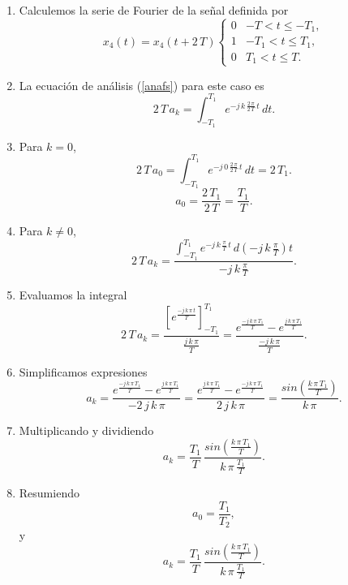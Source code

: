 \begin{enumerate}
\item  Calculemos la serie de Fourier de la se\~{n}al definida por
\begin{equation}
x_{4}\left( t\right) = x_{4}(t+2 \, T)\left\{ 
\begin{array}{cc}
0   & -T < t \leq -T_{1}, \\
1  & -T_{1} < t \leq T_{1}, \\ 
0  & T_{1} < t \leq T.
\end{array}
\right. \label{squarewaveone.1}
\end{equation}
\item La ecuación de análisis (\ref{anafs}) para este caso es
\begin{equation}
2 \, T \, a_{k} = 
\int_{-T_{1}}^{T_{1}} e^{-j \, k \,\frac{2 \, \pi }{2 \, T} \, t} \, dt.
\end{equation}
\item Para $k = 0$,
\begin{equation}
2 \, T \, a_{0} = 
\int_{-T_{1}}^{T_{1}} e^{-j \, 0 \,\frac{2 \, \pi }{2 \, T} \, t} \, dt = 2 \, T_{1}.
\end{equation}
\begin{equation}
a_{0} = \frac{2 \, T_{1}}{2 \, T} = \frac{T_{1}}{T}.
\end{equation}
\item Para $k \neq 0$,
\begin{equation}
2 \, T \, a_{k} = 
\frac{\int_{-T_{1}}^{T_{1}} e^{-j \, k \,\frac{\pi }{T} \, t} \, d(-j \, k \,\frac{\pi }{T})t}{-j \, k \,\frac{\pi }{T}}.
\end{equation}
\item Evaluamos la integral
\begin{equation}
2 \, T \, a_{k} = 
\frac{\left[e^{\frac{-j \, k \, \pi \, t}{T}}\right]_{-T_{1}}^{T_{1}}}{\frac{j \, k \, \pi }{T}} =
\frac{e^{\frac{-j \, k \, \pi \, T_{1}}{T}}-
	  e^{\frac{j \, k \, \pi \, T_{1}}{T}}}{\frac{-j \, k \, \pi }{T}}.
\end{equation}
\item Simplificamos expresiones
\begin{equation}
a_{k} = \frac{e^{\frac{-j \, k \, \pi \, T_{1}}{T}}-
	e^{\frac{j \, k \, \pi \, T_{1}}{T}}}{-2 \, j \, k \, \pi} = 
    \frac{e^{\frac{j \, k \, \pi \, T_{1}}{T}}-
	e^{\frac{-j \, k \, \pi \, T_{1}}{T}}}{2 \, j \, k \, \pi} = 
    \frac{sin(\frac{k \, \pi \, T_{1}}{T})}{k \, \pi}
.
\end{equation}
\item Multiplicando y dividiendo
\begin{equation}
	a_{k} =  \frac{T_{1}}{T} \, \frac{sin(\frac{k \, \pi \, T_{1}}{T})}{k \, \pi \, \frac{T_{1}}{T}}
	.
\end{equation}
\item
Resumiendo
\begin{equation}
 a_{0} = \frac{T_{1}}{T_{2}},
\end{equation}
y
\begin{equation}
	a_{k} =  \frac{T_{1}}{T} \, \frac{sin(\frac{k \, \pi \, T_{1}}{T})}{k \, \pi \, \frac{T_{1}}{T}}
.
\end{equation}


\end{enumerate}

